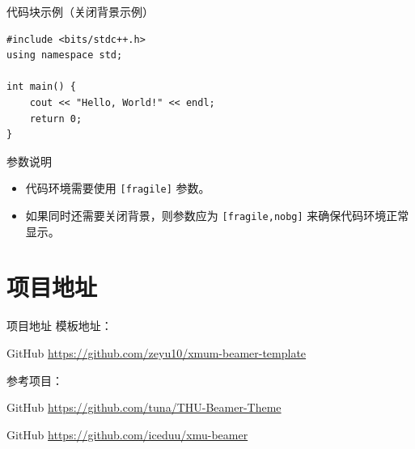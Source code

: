 \documentclass[aspectratio=169,11pt]{ctexbeamer}
\begin{document}
\begin{frame}{代码块示例（关闭背景示例）}
\begin{lstlisting}
#include <bits/stdc++.h>
using namespace std;

int main() {
    cout << "Hello, World!" << endl;
    return 0;
}
\end{lstlisting}
\vspace{5pt}
\begin{alertblock}{参数说明}
    \begin{itemize}
        \item 代码环境需要使用 \texttt{[fragile]} 参数。
        \item 如果同时还需要关闭背景，则参数应为 \texttt{[fragile,nobg]} 来确保代码环境正常显示。
    \end{itemize}
\end{alertblock}
\end{frame}

\section{项目地址}

\begin{frame}{项目地址}
    模板地址：
    \begin{block}{GitHub}
        \url{https://github.com/zeyu10/xmum-beamer-template}
    \end{block}

    参考项目：
    \begin{block}{GitHub}
        \url{https://github.com/tuna/THU-Beamer-Theme}
    \end{block}

    \begin{block}{GitHub}
        \url{https://github.com/iceduu/xmu-beamer}
    \end{block}
\end{frame}


\end{document}
